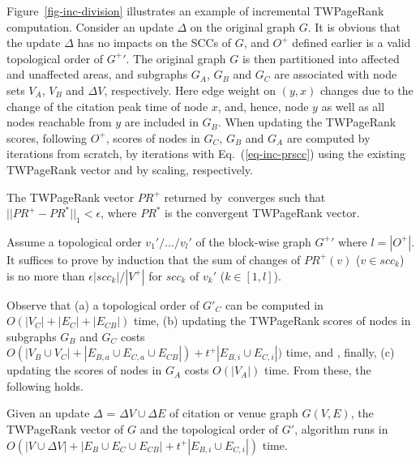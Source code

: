 \begin{example} \label{eg-layer-dag}
Figure~\ref{fig-inc-division} illustrates an example of incremental TWPageRank computation. Consider an update $\Delta$ on the original graph $G$.
%
It is obvious that the update $\Delta$ has no impacts on the SCCs of $G$, and $O^+$ defined earlier is a valid topological order of $G^+{'}$.
%
The original graph $G$ is then partitioned into affected and unaffected areas, and subgraphs $G_A$, $G_B$ and $G_C$ are associated with node sets $V_A$, $V_B$ and $\Delta V$, respectively. Here edge weight on $(y, x)$ changes due to the change of the citation peak time of node $x$, and, hence, node $y$ as well as all nodes reachable from $y$ are included in $G_B$.
%
When updating the TWPageRank scores, following $O^+$, scores of nodes in $G_C$, $G_B$ and $G_A$ are computed by iterations from scratch, by iterations with Eq.~(\ref{eq-inc-prscc}) using the existing TWPageRank vector and by scaling, respectively.
\end{example}

\vspace{-1ex}
\begin{theorem}
\label{lemma-subgraphA}
The TWPageRank vector $PR^+$ returned by~\inctwprscc converges such that $||PR^+-PR^{*}||_1 < \epsilon$, where $PR^{*}$ is the convergent TWPageRank vector.
\end{theorem}


\begin{proofSketch}
Assume a topological order $v_1'/\dots/v_{l}'$ of the block-wise graph $G^+{'}$ where $l=|O^+|$. It suffices to prove by induction that the sum of changes of $PR^+(v)$ ($v\in scc_k$) is no more than $\epsilon |scc_k|/|V^+|$ for $scc_k$ of $v_k'$ ($k\in [1,l]$).
\end{proofSketch}




Observe that (a) a topological order of $G'_C$ can be computed in $O(|V_C|+|E_C|+|E_{CB}|)$ time,
(b) updating the TWPageRank scores of nodes in subgraphs $G_B$ and $G_C$ costs $O(|V_B\cup V_C|+|E_{B,a}\cup E_{C,a}\cup E_{CB}|)+t^+|E_{B,i}\cup E_{C,i}|)$ time, and , finally, (c) updating the scores of nodes in $G_A$ costs $O(|V_A|)$ time. From these, the following holds.


\begin{prop} \label{lemma-inc-citation-comp}
Given an update $\Delta$ = $\Delta V\cup\Delta E$ of citation or venue graph $G(V,E)$, the TWPageRank vector of $G$ and the topological order of $G'$, algorithm \inctwprscc runs in $O(|V\cup \Delta V| + |E_B\cup E_C\cup E_{CB}| + t^+|E_{B,i}\cup E_{C,i}|)$ time.
\end{prop}



